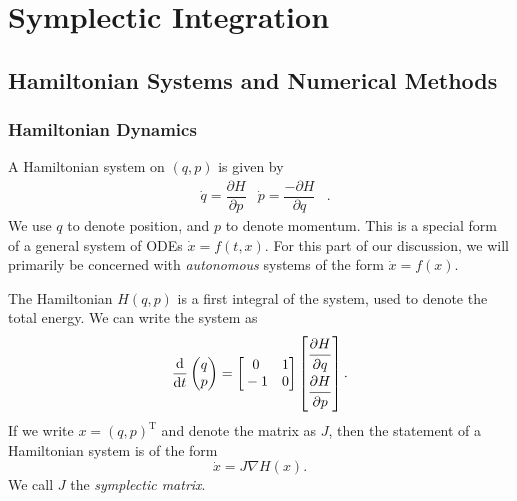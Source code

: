 

\chapter{Symplectic Integration}
\label{cha:ham}

\section{Hamiltonian Systems and Numerical Methods}

\subsection{Hamiltonian Dynamics}

A Hamiltonian system on $(q,p)$ is given by
\begin{align*}
	&\dot{q} = \dfrac{\partial H}{\partial p}
	&
	\dot{p} = \dfrac{-\partial H}{\partial q}&.	
\end{align*}
We use $q$ to denote position, and $p$ to denote momentum.
This is a special form of a general system of ODEs $\dot{x} = f(t,x)$.
For this part of our discussion, we will primarily be concerned with \textit{autonomous} systems of the form $\dot{x} = f(x)$.

The Hamiltonian $H(q,p)$ is a first integral of the system, used to denote the total energy.
We can write the system as
\begin{equation}
	\dfrac{\mathrm{d}}{\mathrm{d}t}\begin{pmatrix}
		q \\
		p
	\end{pmatrix} = \begin{bmatrix}
		\strut 0 & \strut 1 \\
		\strut -1 & \strut 0
	\end{bmatrix}\begin{bmatrix}
	\dfrac{\strut \partial H}{\strut\partial q} \\
	\dfrac{\strut \partial H}{\strut\partial p}
	\end{bmatrix}.
\end{equation}
If we write $x = (q,p)^\mathrm{T}$ and denote the matrix as $J$,
then the statement of a Hamiltonian system is of the form 
\begin{equation}
	{\dot{x}} = {J}\nabla H({x}).
	\label{eqn:hdyn}
\end{equation}
We call $J$ the \textit{symplectic matrix}.


